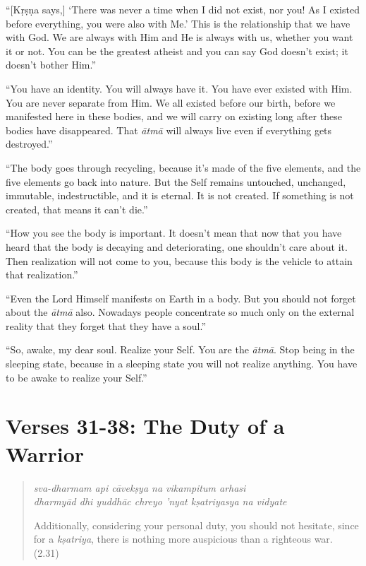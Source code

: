 \documentclass[12pt, twoside, openright]{memoir}
\begin{document}
\enquote{[Kṛṣṇa says,] \enquote{There was never a time when I did not exist, nor you! As I existed before everything, you were also with Me.} This is the relationship that we have with God. We are always with Him and He is always with us, whether you want it or not. You can be the greatest atheist and you can say God doesn’t exist; it doesn’t bother Him.}

\enquote{You have an identity. You will always have it. You have ever existed with Him. You are never separate from Him. We all existed before our birth, before we manifested here in these bodies, and we will carry on existing long after these bodies have disappeared. That \textit{ātmā} will always live even if everything gets destroyed.}

\enquote{The body goes through recycling, because it’s made of the five elements, and the five elements go back into nature. But the Self remains untouched, unchanged, immutable, indestructible, and it is eternal. It is not created. If something is not created, that means it can’t die.}

\enquote{How you see the body is important. It doesn’t mean that now that you have heard that the body is decaying and deteriorating, one shouldn’t care about it. Then realization will not come to you, because this body is the vehicle to attain that realization.}

\enquote{Even the Lord Himself manifests on Earth in a body. But you should not forget about the \textit{ātmā} also. Nowadays people concentrate so much only on the external reality that they forget that they have a soul.}


\enquote{So, awake, my dear soul. Realize your Self. You are the \textit{ātmā}. Stop being in the sleeping state, because in a sleeping state you will not realize anything. You have to be awake to realize your Self.}


\section{Verses 31-38: The Duty of a Warrior}\label{sec-verses-31-38-the-duty-of-a-warrior}


\par
\begin{verse}
\textit{sva-dharmam api cāvekṣya na vikampitum arhasi} \\
\textit{dharmyād dhi yuddhāc chreyo ’nyat kṣatriyasya na vidyate}

\noindent Additionally, considering your personal duty, you should not hesitate, since for a \textit{kṣatriya}, there is nothing more auspicious than a righteous war. (2.31)
\end{verse}
\par
\end{document}
